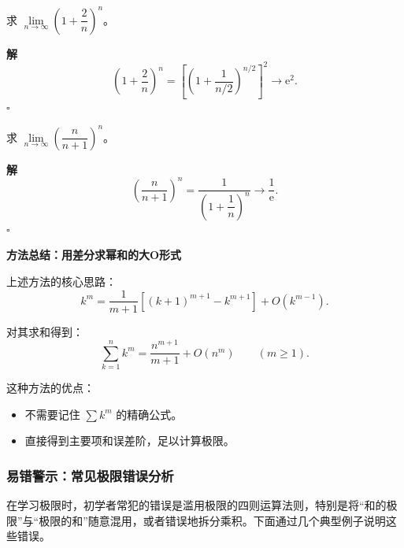 \documentclass[fontset=fandol]{ctexart}
\newenvironment{custom}[1]{\par\noindent\textbf{#1}\quad}{\par\vspace{0.8em}}
\newenvironment{solution}{\par\noindent\textbf{解}\quad}{\hfill$\square$\par\vspace{0.8em}}
\newcommand{\ee}{\mathrm{e}}
\begin{document}
\begin{example}
求 \(\lim\limits_{n\to\infty} \left(1 + \dfrac{2}{n}\right)^n\)。
\end{example}
\begin{solution}
\[
\left(1 + \dfrac{2}{n}\right)^n = \left[\left(1 + \dfrac{1}{n/2}\right)^{n/2}\right]^2 \to \ee^2.
\]
\end{solution}

\begin{example}
求 \(\lim\limits_{n\to\infty} \left(\dfrac{n}{n+1}\right)^n\)。
\end{example}
\begin{solution}
\[
\left(\dfrac{n}{n+1}\right)^n = \dfrac{1}{\left(1 + \dfrac{1}{n}\right)^n} \to \dfrac{1}{\ee}.
\]
\end{solution}



\begin{custom}{方法总结：用差分求幂和的大O形式}

上述方法的核心思路：
\[
k^m = \dfrac{1}{m+1} \left[(k+1)^{m+1} - k^{m+1}\right] + O(k^{m-1}).
\]

对其求和得到：
\[
\sum_{k=1}^n k^m
=\frac{n^{m+1}}{m+1}+O(n^m)
\qquad(m\ge1).
\]

这种方法的优点：
\begin{itemize}
\item 不需要记住 \(\sum  k^m\) 的精确公式。
\item 直接得到主要项和误差阶，足以计算极限。
\end{itemize}
\end{custom}

\subsubsection{易错警示：常见极限错误分析}

在学习极限时，初学者常犯的错误是滥用极限的四则运算法则，特别是将“和的极限”与“极限的和”随意混用，或者错误地拆分乘积。下面通过几个典型例子说明这些错误。
\end{document}
